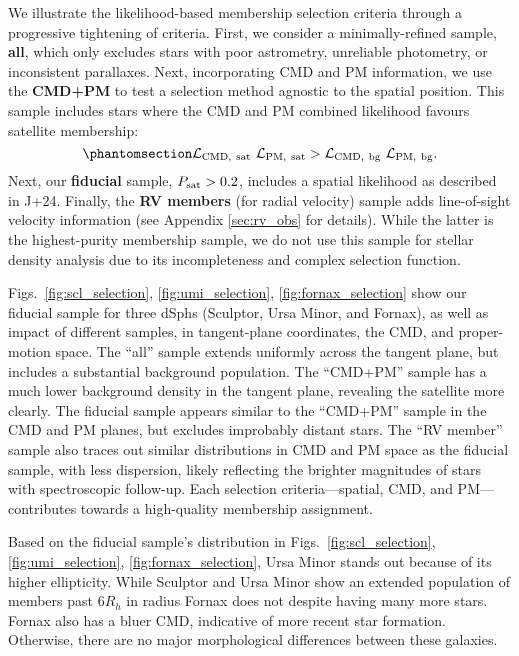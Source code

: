 We illustrate the likelihood-based membership selection criteria through
a progressive tightening of criteria. First, we consider a
minimally-refined sample, \textbf{all}, which only excludes stars with
poor astrometry, unreliable photometry, or inconsistent parallaxes.
Next, incorporating CMD and PM information, we use the \textbf{CMD+PM}
to test a selection method agnostic to the spatial position. This sample
includes stars where the CMD and PM combined likelihood favours
satellite membership:
\begin{equation}\protect\phantomsection\label{eq:sel_cmd_pm}{
{\cal L}_{\rm CMD,\ sat}\ {\cal L}_{\rm PM,\ sat} > {\cal L}_{\rm CMD,\ bg}\ {\cal L}_{\rm PM,\ bg}.
}\end{equation} Next, our \textbf{fiducial} sample,
\(P_{\rm sat} > 0.2\), includes a spatial likelihood as described in
J+24. Finally, the \textbf{RV members} (for radial velocity) sample adds
line-of-sight velocity information (see Appendix \ref{sec:rv_obs} for
details). While the latter is the highest-purity membership sample, we
do not use this sample for stellar density analysis due to its
incompleteness and complex selection function.

Figs.~\ref{fig:scl_selection}, \ref{fig:umi_selection}, \ref{fig:fornax_selection}
show our fiducial sample for three dSphs (Sculptor, Ursa Minor, and
Fornax), as well as impact of different samples, in tangent-plane
coordinates, the CMD, and proper-motion space. The ``all'' sample
extends uniformly across the tangent plane, but includes a substantial
background population. The ``CMD+PM'' sample has a much lower background
density in the tangent plane, revealing the satellite more clearly. The
fiducial sample appears similar to the ``CMD+PM'' sample in the CMD and
PM planes, but excludes improbably distant stars. The ``RV member''
sample also traces out similar distributions in CMD and PM space as the
fiducial sample, with less dispersion, likely reflecting the brighter
magnitudes of stars with spectroscopic follow-up. Each selection
criteria---spatial, CMD, and PM---contributes towards a high-quality
membership assignment.

Based on the fiducial sample's distribution in
Figs.~\ref{fig:scl_selection}, \ref{fig:umi_selection}, \ref{fig:fornax_selection},
Ursa Minor stands out because of its higher ellipticity. While Sculptor
and Ursa Minor show an extended population of members past \(6R_h\) in
radius Fornax does not despite having many more stars. Fornax also has a
bluer CMD, indicative of more recent star formation. Otherwise, there
are no major morphological differences between these galaxies.

